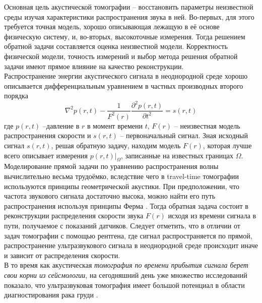 \documentclass[14pt]{matmex-diploma}
\begin{document}
Основная цель акустической томографии -- восстановить параметры неизвестной среды изучая характеристики распространения звука в ней. Во-первых, для этого требуется точная модель, хорошо описывающая лежащую в её основе физическую систему, и, во-вторых, высокоточные измерения. Тогда решением обратной задачи составляется оценка неизвестной модели. Корректность физической модели, точность измерений и выбор метода решения обратной задачи имеют прямое влияние на качество реконструкции. \\
Распространение энергии акустического сигнала в неоднородной среде хорошо описывается дифференциальным уравнением в частных производных второго порядка 
$$\nabla^2p(r,t) - \frac{1}{F^2(r)}\frac{\partial^2p(r,t)}{\partial t^2} = s(r,t)$$
где $p(r, t)$ --давление в $r$ в момент времени $t$, $F(r)$ -- неизвестная модель распространения скорости и $s(r,t)$ -- первоначальный сигнал. Зная исходный сигнал $s(r, t)$, решая обратную задачу, находим модель $F(r)$, которая лучше всего описывает измерения $p(r,t)|_{\Omega}$, записанные на известных границах $\Omega$.\\
Моделирование прямой задачи по уравнению распространения волны вычислительно весьма трудоёмко, вследствие чего в travel-time томографии используются принципы геометрической акустики. При предположении, что частота звукового сигнала достаточно высока, можно найти его путь распространения используя принципы Ферма \cite{schuster1904introduction}. Тогда обратная задача состоит в реконструкции распределения скорости звука $F(r)$ исходя из времени сигнала в пути, получаемое с показаний датчиков. Следует отметить, что в отличии от задач томографии с помощью рентгена, где сигнал распространяется по прямой, распространение ультразвукового сигнала в неоднородной среде происходит иначе и зависит от распределения скорости.\\
В то время как акустическая \textit{томография по времени прибытия сигнала берет свои корни из сейсмологии}\cite{dines1979computerized}, на сегодняшний день уже множество исследований показало, что ультразвуковая томография имеет большой потенциал в области диагностирования рака груди \cite{duric2007detection}. \\
\end{document}
